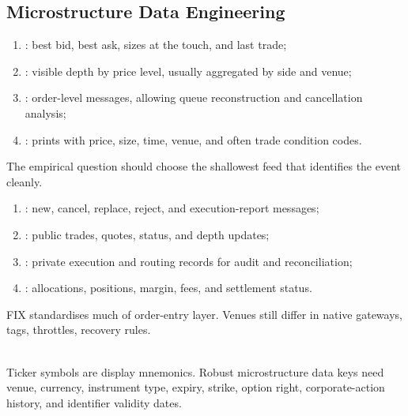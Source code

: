 \subsection{Microstructure Data Engineering}

\begin{taxonomy} 
\begin{enumerate}[label=\roman*.]
\setlength{\itemsep}{0pt}
\item {}: best bid, best ask, sizes at the touch, and last trade;
\item {}: visible depth by price level, usually aggregated by side and venue;
\item {}: order-level messages, allowing queue reconstruction and cancellation analysis;
\item {}: prints with price, size, time, venue, and often trade condition codes.
\end{enumerate}
The empirical question should choose the shallowest feed that identifies the event cleanly.
\end{taxonomy}

\begin{taxonomy} 
\begin{enumerate}[label=\roman*.]
\setlength{\itemsep}{0pt}
\item {}: new, cancel, replace, reject, and execution-report messages;
\item {}: public trades, quotes, status, and depth updates;
\item {}: private execution and routing records for audit and reconciliation;
\item {}: allocations, positions, margin, fees, and settlement status.
\end{enumerate}
FIX standardises much of order-entry layer. Venues still differ in native gateways, tags, throttles, recovery rules.
\end{taxonomy}

\begin{caveat} \\
Ticker symbols are display mnemonics. Robust microstructure data keys need venue, currency, instrument type, expiry, strike, option right, corporate-action history, and identifier validity dates.
\end{caveat}

